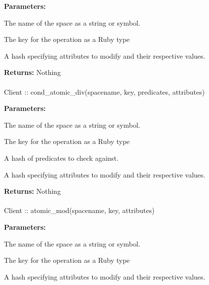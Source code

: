 \noindent\textbf{Parameters:}
\begin{description}[labelindent=\widthof{{attributes}},leftmargin=*,noitemsep,nolistsep,align=right]
\item[spacename] The name of the space as a string or symbol.
\item[key] The key for the operation as a Ruby type
\item[attributes] A hash specifying attributes to modify and their respective values.
\end{description}

\noindent\textbf{Returns:}
Nothing

\paragraph{}
\begin{ccode}
Client :: cond_atomic_div(spacename, key, predicates, attributes)
\end{ccode}
\funcdesc 

\noindent\textbf{Parameters:}
\begin{description}[labelindent=\widthof{{predicates}},leftmargin=*,noitemsep,nolistsep,align=right]
\item[spacename] The name of the space as a string or symbol.
\item[key] The key for the operation as a Ruby type
\item[predicates] A hash of predicates to check against.
\item[attributes] A hash specifying attributes to modify and their respective values.
\end{description}

\noindent\textbf{Returns:}
Nothing

\paragraph{}
\begin{ccode}
Client :: atomic_mod(spacename, key, attributes)
\end{ccode}
\funcdesc 

\noindent\textbf{Parameters:}
\begin{description}[labelindent=\widthof{{attributes}},leftmargin=*,noitemsep,nolistsep,align=right]
\item[spacename] The name of the space as a string or symbol.
\item[key] The key for the operation as a Ruby type
\item[attributes] A hash specifying attributes to modify and their respective values.
\end{description}

